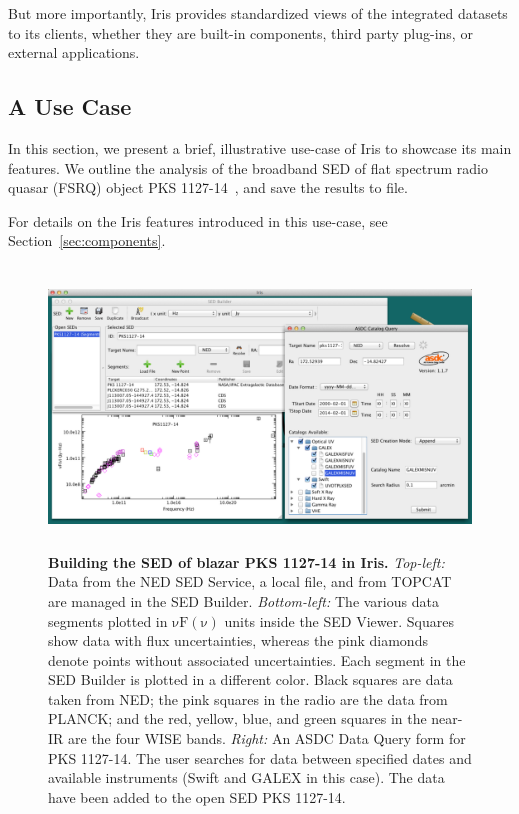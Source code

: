 \documentclass[preprint,authoryear,5p]{elsarticle}
\begin{document}
But more importantly, Iris provides standardized views of the integrated
datasets to its clients, whether they are built-in components, third party
plug-ins, or external applications.

\subsection{A Use Case} \label{subsec:usecase}

In this section, we present a brief, illustrative use-case
of Iris to showcase its main features. We outline the analysis of the broadband SED
of flat spectrum radio quasar (FSRQ) object PKS 1127-14~\citep[see][]{2004ApJ...600L..27B}, and save the
results to file.

For details on the Iris features introduced in this use-case, see Section~\ref{sec:components}.

\begin{figure} \centering
\includegraphics[height=2.95in,width=5.3in]{built-in-visuals-loading.pdf}
\caption{\textbf{Building the SED of blazar PKS 1127-14 in Iris.}  
\textit{Top-left:} Data from the NED SED Service, a local file, and from TOPCAT
are managed in the SED Builder. \textit{Bottom-left:} The various data segments
plotted in $\mathrm{\nu F \left( \nu \right)}$ units inside the SED Viewer.
Squares show data with flux uncertainties, whereas the pink diamonds denote
points without associated uncertainties. Each segment in the SED Builder is
plotted in a different color. Black squares are data taken from NED; the
pink squares in the radio are the data from PLANCK; and the red, yellow, blue,
and green squares in the near-IR are the four WISE bands. \textit{Right:} An ASDC
Data Query form for PKS 1127-14. The user searches for data between specified
dates and available instruments (Swift and GALEX in this case). The data have
been added to the open SED PKS 1127-14.} \label{fig:load_data}
\end{figure}
\end{document}

